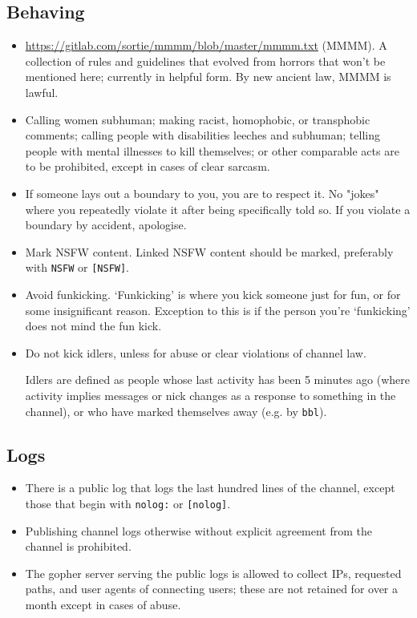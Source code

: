 \documentclass[11pt]{article}
\begin{document}
\subsection{Behaving}

\begin{itemize}
\item \url{https://gitlab.com/sortie/mmmm/blob/master/mmmm.txt} (MMMM).
A collection of rules and guidelines that evolved from horrors that won't be mentioned
here; currently in helpful form. By new ancient law, MMMM is lawful.

\item Calling women subhuman; making racist, homophobic, or transphobic
comments; calling people with disabilities leeches and subhuman;
telling people with mental illnesses to kill themselves; or other comparable acts
are to be prohibited, except in cases of clear sarcasm.

\item If someone lays out a boundary to you, you are to respect it. No "jokes" where you
repeatedly violate it after being specifically told so. If you violate a boundary by accident,
apologise.

\item Mark NSFW content. Linked NSFW content should be marked, preferably with
\texttt{NSFW} or \texttt{[NSFW]}.

\item Avoid funkicking.
`Funkicking' is where you kick someone just for fun, or for some insignificant reason.
Exception to this is if the person you're `funkicking' does not mind the fun kick.

\item Do not kick idlers, unless for abuse or clear violations of channel law.

Idlers are defined as people whose last activity has been 5 minutes ago (where activity
implies messages or nick changes as a response to something in the channel), or who
have marked themselves away (e.g. by \texttt{bbl}).
\end{itemize}


\subsection{Logs}

\begin{itemize}
\item There is a public log that logs the last hundred lines of the channel, except those that
begin with \texttt{nolog:} or \texttt{[nolog]}.
\item Publishing channel logs otherwise without explicit agreement from the channel is
prohibited.
\item The gopher server serving the public logs is allowed to collect IPs, requested paths,
and user agents of connecting users; these are not retained for over a month except in cases
of abuse.
\end{itemize}
\end{document}
